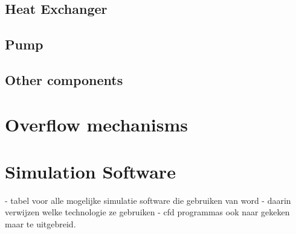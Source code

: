 \subsection{Heat Exchanger}
\subsection{Pump}
\subsection{Other components}
\section{Overflow mechanisms}

\section{Simulation Software}
- tabel voor alle mogelijke simulatie software die gebruiken van word
- daarin verwijzen welke technologie ze gebruiken
- cfd programmas ook naar gekeken maar te uitgebreid. 

